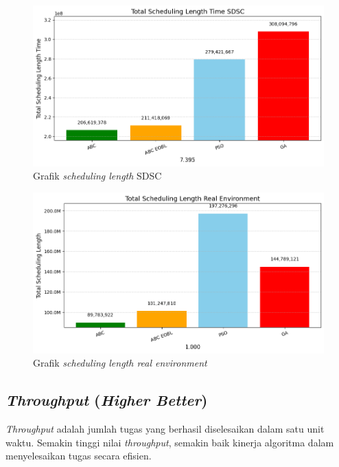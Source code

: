 \newpage

\begin{figure} [H]
    \centering
    \includegraphics[width=0.75\linewidth]{gambar/Grafik Scheduling Length SDSC.png}
    \caption{Grafik \textit{scheduling length} SDSC}
\end{figure}

\begin{figure} [H]
    \centering
    \includegraphics[width=0.75\linewidth]{gambar/Grafik Scheduling Length Real Environment.png}
    \caption{Grafik \textit{scheduling length real environment}}
\end{figure}

\subsection{\textit{Throughput} (\textit{Higher Better})}
\textit{Throughput} adalah jumlah tugas yang berhasil diselesaikan dalam satu unit waktu. Semakin tinggi nilai \textit{throughput}, semakin baik kinerja algoritma dalam menyelesaikan tugas secara efisien.

\newpage

